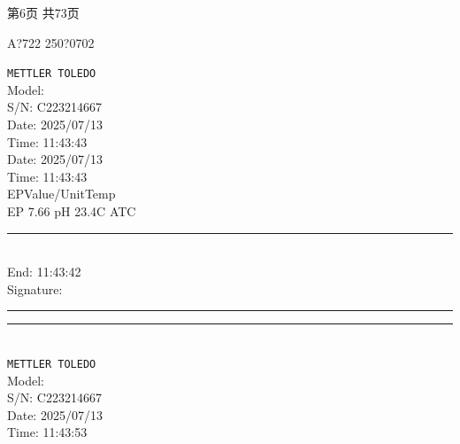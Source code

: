 \documentclass[UTF8,10pt,a4paper,fontset=fandol]{ctexart}
\newcommand{\fieldvalue}[1]{#1}
\newcommand{\handwritten}[1]{#1}
\begin{document}
\begin{center}
第6页 共73页
\end{center}

\newpage

\handwritten{A?722 250?0702}

\begin{center}
\begin{minipage}{0.32\textwidth}
\small
\texttt{METTLER TOLEDO}\\
Model: \\
S/N:
\fieldvalue{C223214667}\\
Date:
\fieldvalue{2025/07/13}\\
Time:
\fieldvalue{11:43:43}\\[0.5em]

Date:
\fieldvalue{2025/07/13}\\
Time:
\fieldvalue{11:43:43}\\
EP\quad Value/Unit\quad Temp\\
EP
\fieldvalue{7.66 pH}
\quad
\fieldvalue{23.4\textdegree C ATC}\\[0.5em]

\noindent\rule{\linewidth}{0.2pt}\\[-0.2em]
End:
\fieldvalue{11:43:42}\\
Signature: \\
\rule{\linewidth}{0.2pt}

\vspace{1em}
\noindent\rule{\linewidth}{0.2pt}\\[-0.2em]
\texttt{METTLER TOLEDO}\\
Model: \\
S/N:
\fieldvalue{C223214667}\\
Date:
\fieldvalue{2025/07/13}\\
Time:
\fieldvalue{11:43:53}\\[0.5em]


\end{minipage}
\end{center}
\end{document}
